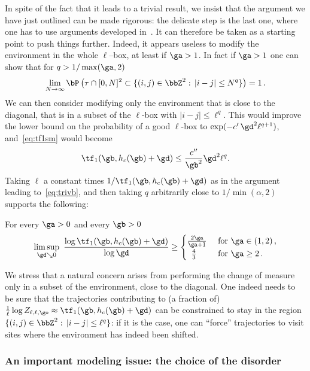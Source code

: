 In spite of the fact that it leads to a trivial result, we insist that the argument we have just outlined can be made rigorous: the delicate step is the last one, where one has to use arguments developed in~\cite{cf:GTalea}. It can therefore be taken as a starting point to push things further. Indeed, it appears useless to modify the environment in the whole $\ell$--box, at least if $\ga>1$. In fact if $\ga>1$ one can show that for $q>1/ \max(\ga,2)$
\begin{equation}\label{eq:evin}
\lim_{N \to \infty}\bP \left(\tau \cap [0, N]^2 \subset \{(i,j) \in \bbZ^2:\,\vert i-j \vert \le N^q \}\right)= 1\,.
\end{equation}
We can then consider modifying only the environment that is close to the diagonal, that is in a subset of the $\ell$-box with $|i-j|\leq \ell^q$. This would improve the lower bound on the probability of a good $\ell$-box to $\exp(- c'\,\gd^2 \ell^{q+1})$, and~\eqref{eq:tf1sm} would become
\[
\tf_1(\gb,h_c(\gb)+\gd) \leq \frac{c''}{\gb^2} \gd^2 \ell^{q}.
\]
Taking $\ell$ a constant times $1/\tf_1(\gb,h_c(\gb)+\gd)$ as in the argument leading to~\eqref{eq:trivb}, and then taking $q$ arbitrarily close to $1/\min(\alpha,2)$ supports the following:
\begin{conj}
For every $\ga>0$ and every $\gb >0$\label{conj:smoothing}
\begin{equation}
\limsup_{\gd \searrow 0} \
\frac{\log \tf_1 (\gb, h_c(\gb)+\gd) }{\log \gd}\ge
\begin{cases}
\frac{2\ga}{\ga+1} & \text{ for } \ga \in (1,2)\,,
\\
\;\:\frac{4}{3} & \text{ for } \ga \ge 2\,.
\end{cases}
\end{equation}
\end{conj}

We stress that a natural concern arises from performing the change of measure only in a subset of the environment, close to the diagonal. One indeed needs to be sure that the trajectories contributing to (a fraction of) $ \frac{1}{\ell} \log Z_{\ell,\ell,\go} \approx \tf_1(\gb,h_c(\gb)+\gd)$ can be constrained to stay in the region $\{(i,j) \in \bbZ^2:\,\vert i-j \vert \le \ell^q \}$: if it is the case, one can ``force'' trajectories to visit sites where the environment has indeed been shifted.

\subsubsection{An important modeling issue: the choice of the disorder}


